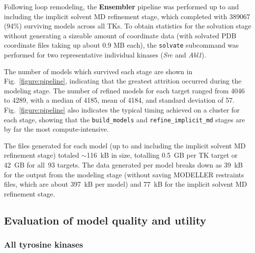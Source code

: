 \documentclass[aps,pre,twocolumn,nofootinbib,superscriptaddress,linenumbers]{revtex4-1}
\begin{document}
Following loop remodeling, the {\bf Ensembler} pipeline was performed up to and including the implicit solvent MD refinement stage, which completed with \num{389067} (94\%) surviving models across all TKs.
To obtain statistics for the solvation stage without generating a sizeable amount of coordinate data (with solvated PDB coordinate files taking up about 0.9 MB each), the {\tt solvate} subcommand was performed for two representative individual kinases (\emph{Src} and \emph{Abl1}).

The number of models which survived each stage are shown in Fig.~\ref{figure:pipeline}, indicating that the greatest attrition occurred during the modeling stage.
The number of refined models for each target ranged from \num{4046} to \num{4289}, with a median of \num{4185}, mean of \num{4184}, and standard deviation of \num{57}.
Fig.~\ref{figure:pipeline} also indicates the typical timing achieved on a cluster for each stage, showing that the {\tt build\_models} and {\tt refine\_implicit\_md} stages are by far the most compute-intensive.

The files generated for each model (up to and including the implicit solvent MD refinement stage) totaled $\sim$116~kB in size, totalling 0.5~GB per TK target or 42~GB for all~93 targets.
The data generated per model breaks down as 39~kB for the output from the modeling stage (without saving MODELLER restraints files, which are about 397~kB per model) and 77~kB for the implicit solvent MD refinement stage.

\subsection*{Evaluation of model quality and utility}

\subsubsection*{All tyrosine kinases}


\end{document}
